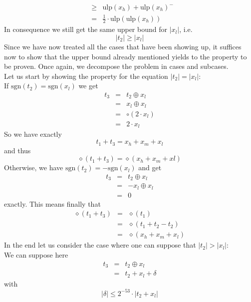 \documentclass[a4paper,10pt,twoside]{article}
\newenvironment{proof}[1][Proof]{\begin{trivlist}
\item[\hskip \labelsep {\bfseries #1}]}{\end{trivlist}}
\newcommand{\hi}{\ensuremath{\mathit{h}}}
\newcommand{\mi}{\ensuremath{\mathit{m}}}
\newcommand{\lo}{\ensuremath{\mathit{l}}}
\newcommand{\mUlp}{\ensuremath{\mathrm{ulp}}}
\newcommand{\sgn}{\ensuremath{\mathrm{sgn}}}
\begin{document}
\begin{proof}
\begin{eqnarray*}
& \geq & \mUlp\left( x_\hi \right) + \mUlp\left( x_\hi \right)^- \\
& = & \frac{1}{2} \cdot \mUlp\left( \mUlp\left( x_\hi \right) \right)
\end{eqnarray*}
In consequence we still get the same upper bound for $\left \vert x_\lo \right \vert$, i.e.
$$\left \vert t_2 \right \vert \geq \left \vert x_\lo \right \vert$$
Since we have now treated all the cases that have been showing up, it suffices now to show that the upper bound
already mentioned yields to the property to be proven. Once again, we decompose the problem in cases and subcases.\\
Let us start by showing the property for the equation $\left \vert t_2 \right \vert = \left \vert x_\lo \right \vert$: \\
If $\sgn\left( t_2 \right) = \sgn\left( x_\lo \right)$ we get
\begin{eqnarray*}
t_3 & = & t_2 \oplus x_\lo \\
& = & x_\lo \oplus x_\lo \\
& = & \circ \left( 2 \cdot x_\lo \right) \\
& = & 2 \cdot x_\lo
\end{eqnarray*}
So we have exactly
$$t_1 + t_3 = x_\hi + x_\mi + x_\lo$$
and thus
$$\diamond \left( t_1 + t_3 \right) = \diamond \left( x_\hi + x_\mi + x\lo \right)$$
Otherwise, we have $\sgn\left( t_2 \right) = -\sgn\left( x_\lo \right)$ and get
\begin{eqnarray*}
t_3 & = & t_2 \oplus x_\lo \\
& = & - x_\lo \oplus x_\lo \\
& = & 0 
\end{eqnarray*}
exactly.
This means finally that
\begin{eqnarray*}
\diamond \left( t_1 + t_3 \right) & = & \diamond \left( t_1 \right) \\
& = & \diamond \left( t_1 + t_2 - t_2 \right) \\
& = & \diamond \left( x_\hi + x_\mi + x_\lo \right)
\end{eqnarray*}
In the end let us consider the case where one can suppose that 
$\left \vert t_2 \right \vert > \left \vert x_\lo \right \vert$: \\
We can suppose here
\begin{eqnarray*}
t_3 & = & t_2 \oplus x_\lo \\
& = & t_2 + x_\lo + \delta
\end{eqnarray*}
with
$$\left \vert \delta \right \vert \leq 2^{-53} \cdot \left \vert t_2 + x_\lo \right \vert$$

\end{proof}
\end{document}
